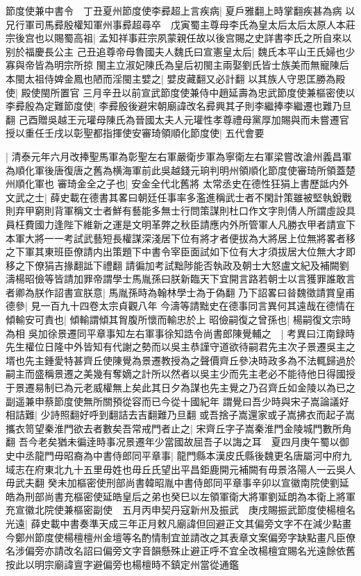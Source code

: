 節度使兼中書令　丁丑夏州節度使李彛超上言疾病|{
	夏戶雅翻上時掌翻疾甚為病}
以兄行軍司馬彛殷權知軍州事彛超尋卒　戊寅蜀主尊母李氏為皇太后太后太原人本莊宗後宫也以賜蜀高祖|{
	孟知祥事莊宗夙蒙親任故以後宫賜之史詳書李氏之所自來以别於福慶長公主}
己丑追尊帝母魯國夫人魏氏曰宣憲皇太后|{
	魏氏本平山王氏婦也少寡與帝皆為明宗所掠}
閩主立淑妃陳氏為皇后初閩主兩娶劉氏皆士族美而無寵陳后本閩太祖侍婢金鳳也陋而淫閩主嬖之|{
	嬖皮藏翻又必計翻}
以其族人守恩匡勝為殿使|{
	殿使閩所置官}
三月辛丑以前宣武節度使兼侍中趙延壽為忠武節度使兼樞密使以李彛殷為定難節度使|{
	李彛殷後避宋朝廟諱改名彛興其子則李繼捧李繼遷也難乃旦翻}
己酉贈吳越王元瓘母陳氏為晉國太夫人元瓘性孝尊禮母黨厚加賜與而未嘗遷官授以重任壬戌以彰聖都指揮使安審琦領順化節度使|{
	五代會要}


|{
	清泰元年六月改捧聖馬軍為彰聖左右軍嚴衛步軍為寧衛左右軍梁嘗改滄州義昌軍為順化軍後唐復唐之舊為横海軍前此吳越錢元珦判明州領順化節度使審琦所領蓋楚州順化軍也}
審琦金全之子也|{
	安金全代北舊將}
太常丞史在德性狂狷上書歷詆内外文武之士|{
	薛史載在德書其畧曰朝廷任事率多濫進稱武士者不閑計策雖被堅執銳戰則弃甲窮則背軍稱文士者鮮有藝能多無士行問策謀則杜口作文字則倩人所謂虛設具員枉費國力逢陛下維新之運是文明革弊之秋臣請應内外所管軍人凡勝衣甲者請宣下本軍大將一一考試武藝短長權謀深淺居下位有將才者便拔為大將居上位無將畧者移之下軍其東班臣僚請内出策題下中書令宰臣面試如下位有大才須拔居大位無大才即移之下僚狷吉掾翻詆下禮翻}
請徧加考試黜陟能否執政及朝士大怒盧文紀及補闕劉濤楊昭儉等皆請加罪帝謂學士馬胤孫曰朕新臨天下宜開言路若朝士以言獲罪誰敢言者卿為朕作詔書宣朕意|{
	馬胤孫時為翰林學士為于偽翻}
乃下詔畧曰㫺魏徵請賞皇甫德參|{
	見一百九十四卷太宗貞觀八年}
今濤等請黜史在德事同言異何其遠哉在德情在傾輸安可責也|{
	傾輸謂傾其胷腹所懷而輸忠於上}
昭儉嗣復之曾孫也|{
	楊嗣復文宗時為相}
吳加徐景遷同平章事知左右軍事徐知誥令尚書郎陳覺輔之　|{
	考異曰江南録時先生權位日隆中外皆知有代謝之勢而以吳主恭謹守道欲待嗣君先主次子景遷吳主之壻也先主鍾愛特甚齊丘使陳覺為景遷教授為之聲價齊丘參决時政多為不法輒歸過於嗣主而盛稱景遷之美幾有奪嫡之計所以然者以吳主少而先主老必不能待他日得國授于景遷易制已為元老威權無上矣此其日夕為謀也先主覺之乃召齊丘如金陵以為已之副遥兼申蔡節度使無所關預從容而已今從十國紀年}
謂覺曰吾少時與宋子嵩論議好相詰難|{
	少詩照翻好呼到翻詰去吉翻難乃旦翻}
或吾捨子嵩還家或子嵩拂衣而起子嵩攜衣笥望秦淮門欲去者數矣吾常戒門者止之|{
	宋齊丘字子嵩秦淮門金陵城門數所角翻}
吾今老矣猶未徧逹時事况景遷年少當國故屈吾子以誨之耳　夏四月庚午蜀以御史中丞龍門毋昭裔為中書侍郎同平章事|{
	龍門縣本漢皮氏縣後魏更名唐屬河中府九域志在府東北九十五里毋姓也毋丘氏望出平昌鉅鹿開元補闕有毋景洛陽人一云吳人毋武夫翻}
癸未加樞密使刑部尚書韓昭胤中書侍郎同平章事辛卯以宣徽南院使劉延皓為刑部尚書充樞密使延皓皇后之弟也癸巳以左領軍衛大將軍劉延朗為本衛上將軍充宣徽北院使兼樞密副使　五月丙申契丹寇新州及振武　庚戌賜振武節度使楊檀名光遠|{
	薛史載中書奏準天成三年正月敕凡廟諱但回避正文其偏旁文字不在減少點畫今鄭州節度使楊檀檀州金壇等名酌情制宜並請改之其表章文案偏旁字缺點畫凡臣僚名涉偏旁亦請改名詔曰偏旁文字音韻懸殊止避正呼不宜全改楊檀宜賜名光遠餘依舊按此以明宗廟諱亶字避偏旁也楊檀時不鎮定州當從通鑑}
